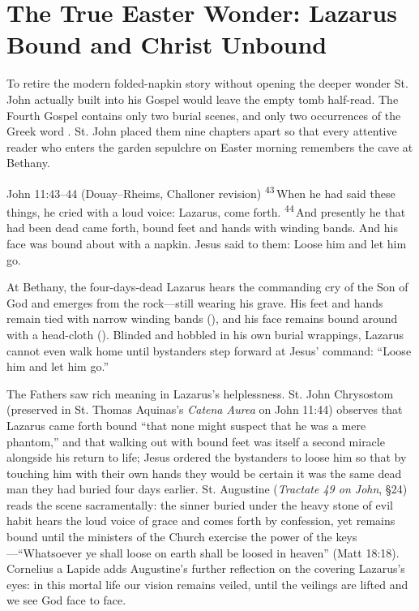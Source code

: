\section{The True Easter Wonder: Lazarus Bound and Christ Unbound}
\label{sec:lazarus-christ}

To retire the modern folded-napkin story without opening the deeper wonder St. John actually built into his Gospel would leave the empty tomb half-read. The Fourth Gospel contains only two burial scenes, and only two occurrences of the Greek word . St. John placed them nine chapters apart so that every attentive reader who enters the garden sepulchre on Easter morning remembers the cave at Bethany.

\begin{massbox}{John 11:43--44 (Douay--Rheims, Challoner revision)}
\textsuperscript{43}\,When he had said these things, he cried with a loud voice: Lazarus, come forth.
\textsuperscript{44}\,And presently he that had been dead came forth, bound feet and hands with winding bands. And his face was bound about with a napkin. Jesus said to them: Loose him and let him go.
\end{massbox}

At Bethany, the four-days-dead Lazarus hears the commanding cry of the Son of God and emerges from the rock---still wearing his grave. His feet and hands remain tied with narrow winding bands (), and his face remains bound around with a head-cloth (). Blinded and hobbled in his own burial wrappings, Lazarus cannot even walk home until bystanders step forward at Jesus' command: ``Loose him and let him go.''

The Fathers saw rich meaning in Lazarus's helplessness. St. John Chrysostom (preserved in St. Thomas Aquinas's \emph{Catena Aurea} on John 11:44) observes that Lazarus came forth bound ``that none might suspect that he was a mere phantom,'' and that walking out with bound feet was itself a second miracle alongside his return to life; Jesus ordered the bystanders to loose him so that by touching him with their own hands they would be certain it was the same dead man they had buried four days earlier. St. Augustine (\emph{Tractate 49 on John}, \S 24) reads the scene sacramentally: the sinner buried under the heavy stone of evil habit hears the loud voice of grace and comes forth by confession, yet remains bound until the ministers of the Church exercise the power of the keys---``Whatsoever ye shall loose on earth shall be loosed in heaven'' (Matt 18:18). Cornelius a Lapide adds Augustine's further reflection on the  covering Lazarus's eyes: in this mortal life our vision remains veiled, until the veilings are lifted and we see God face to face.

